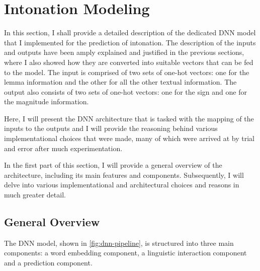 

\chapter{Intonation Modeling}\label{chap:intonation-modeling}

In this section, I shall provide a detailed description of the dedicated \ac{DNN} model that I implemented for the prediction of intonation.
The description of the inputs and outputs have been amply explained and justified in the previous sections, where I also showed how they are converted into suitable vectors that can be fed to the model.
The input is comprised of two sets of one-hot vectors: one for the lemma information and the other for all the other textual information.
The output also consists of two sets of one-hot vectors: one for the sign and one for the magnitude information.

Here, I will present the \ac{DNN} architecture that is tasked with the mapping of the inputs to the outputs and I will provide the reasoning behind various implementational choices that were made, many of which were arrived at by trial and error after much experimentation.

In the first part of this section, I will provide a general overview of the architecture, including its main features and components.
Subsequently, I will delve into various implementational and architectural choices and reasons in much greater detail.


\vfill

\section{General Overview}


The \ac{DNN} model, shown in \autoref{fig:dnn-pipeline}, is structured into three main components:
a word embedding component, a linguistic interaction component and a prediction component.

